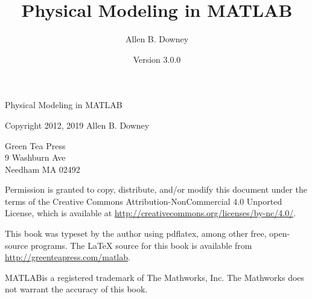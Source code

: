 \documentclass[cfonts]{nostarch}
\newcommand{\myreg}{\textsuperscript{{\tiny \textregistered}}}
\begin{document}
\frontmatter

\newcommand{\thetitle}{Physical Modeling in MATLAB\myreg}
\newcommand{\theversion}{3.0.0}

\title {\thetitle}
\author {Allen B. Downey}
\date {Version \theversion}


\maketitle

\vspace{2in}

\begin{center}
{\Large \thetitle}

\vspace{0.25in}

Copyright 2012, 2019 Allen B. Downey
\end{center}

\vspace{0.25in}

\begin{flushleft}
Green Tea Press       \\
9 Washburn Ave \\
Needham MA 02492
\end{flushleft}

Permission is granted to copy, distribute, and/or modify this document
under the terms of the Creative Commons Attribution-NonCommercial 4.0 Unported License, which is available at \url{http://creativecommons.org/licenses/by-nc/4.0/}.

This book was typeset by the author using pdflatex,
among other free, open-source programs.
The LaTeX source for this book is available from
\url{http://greenteapress.com/matlab}.


MATLAB\myreg is a registered trademark of The
Mathworks, Inc.  The Mathworks does not warrant the accuracy
of this book.



\dominitoc
\dominilof
\dominilot
\tableofcontents
\adjustmtc{}

\mainmatter






























\printindex
\end{document}
